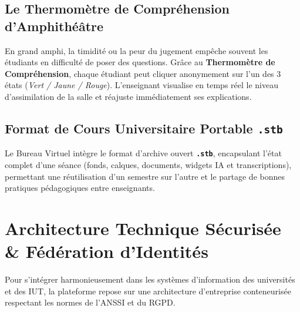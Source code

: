 \documentclass[11pt,a4paper]{article}
\begin{document}
\subsection{Le Thermomètre de Compréhension d'Amphithéâtre}
En grand amphi, la timidité ou la peur du jugement empêche souvent les étudiants en difficulté de poser des questions. Grâce au \textbf{Thermomètre de Compréhension}, chaque étudiant peut cliquer anonymement sur l'un des 3 états (\textit{Vert / Jaune / Rouge}). L'enseignant visualise en temps réel le niveau d'assimilation de la salle et réajuste immédiatement ses explications.

\subsection{Format de Cours Universitaire Portable \texttt{.stb}}
Le Bureau Virtuel intègre le format d'archive ouvert \textbf{\texttt{.stb}}, encapsulant l'état complet d'une séance (fonds, calques, documents, widgets IA et transcriptions), permettant une réutilisation d'un semestre sur l'autre et le partage de bonnes pratiques pédagogiques entre enseignants.

\newpage
\section{Architecture Technique Sécurisée \& Fédération d'Identités}

Pour s'intégrer harmonieusement dans les systèmes d'information des universités et des IUT, la plateforme repose sur une architecture d'entreprise conteneurisée respectant les normes de l'ANSSI et du RGPD.
\end{document}
